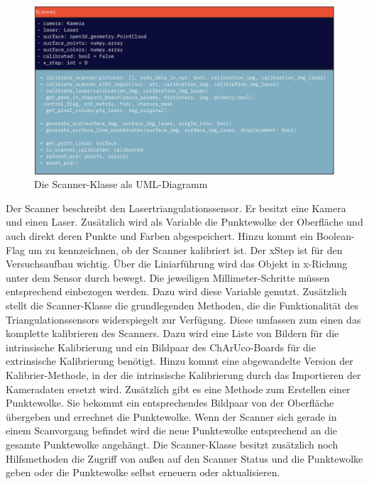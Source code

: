 		\begin{figure}[h]
			\centering
			\includegraphics[width=0.85\linewidth]{img/hauptteil/software/Scanner_UML.png}
			\caption{Die Scanner-Klasse als UML-Diagramm}
			\label{fig:scanner_uml}
		\end{figure}
		Der Scanner beschreibt den Lasertriangulationssensor. Er besitzt eine Kamera und einen Laser. Zusätzlich wird als Variable die Punktewolke der Oberfläche und auch direkt deren Punkte und Farben abgespeichert. Hinzu kommt ein Boolean-Flag um zu kennzeichnen, ob der Scanner kalibriert ist. Der xStep ist für den Versuchsaufbau wichtig. Über die Liniarführung wird das Objekt in x-Richung unter dem Sensor durch bewegt. Die jeweiligen Millimeter-Schritte müssen entsprechend einbezogen werden. Dazu wird diese Variable genutzt. \newline
		Zusätzlich stellt die Scanner-Klasse die grundlegenden Methoden, die die Funktionalität des Triangulationssensors widerspiegelt zur Verfügung. Diese umfassen zum einen das komplette kalibrieren des Scanners. Dazu wird eine Liste von Bildern für die intrinsische Kalibrierung und ein Bildpaar des ChArUco-Boards für die extrinsische Kalibrierung benötigt. Hinzu kommt eine abgewandelte Version der Kalibrier-Methode, in der die intrinsische Kalibrierung durch das Importieren der Kameradaten ersetzt wird. Zusätzlich gibt es eine Methode zum Erstellen einer Punktewolke. Sie bekommt ein entsprechendes Bildpaar von der Oberfläche übergeben und errechnet die Punktewolke. Wenn der Scanner sich gerade in einem Scanvorgang befindet wird die neue Punktewolke entsprechend an die gesamte Punktewolke angehängt. Die Scanner-Klasse besitzt zusätzlich noch Hilfsmethoden die Zugriff von außen auf den Scanner Status und die Punktewolke geben oder die Punktewolke selbst erneuern oder aktualisieren.
		

